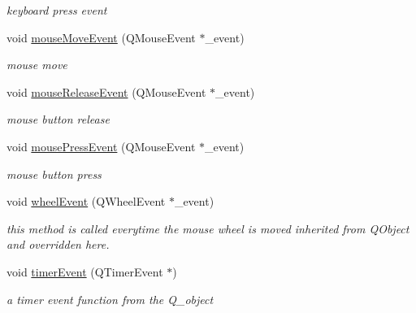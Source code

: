\begin{DoxyCompactItemize}
\begin{DoxyCompactList}\small\item\em keyboard press event \end{DoxyCompactList}\item 
\hypertarget{class_open_g_l_widget_aa6d543f552c813df3b3a78dc5c4899fd}{void \hyperlink{class_open_g_l_widget_aa6d543f552c813df3b3a78dc5c4899fd}{mouse\-Move\-Event} (Q\-Mouse\-Event $\ast$\-\_\-event)}\label{class_open_g_l_widget_aa6d543f552c813df3b3a78dc5c4899fd}

\begin{DoxyCompactList}\small\item\em mouse move \end{DoxyCompactList}\item 
\hypertarget{class_open_g_l_widget_aa3f5541e5da2d5c52ca16b99f40dfd75}{void \hyperlink{class_open_g_l_widget_aa3f5541e5da2d5c52ca16b99f40dfd75}{mouse\-Release\-Event} (Q\-Mouse\-Event $\ast$\-\_\-event)}\label{class_open_g_l_widget_aa3f5541e5da2d5c52ca16b99f40dfd75}

\begin{DoxyCompactList}\small\item\em mouse button release \end{DoxyCompactList}\item 
\hypertarget{class_open_g_l_widget_adaab83f0bed689b0765d42b6ae760220}{void \hyperlink{class_open_g_l_widget_adaab83f0bed689b0765d42b6ae760220}{mouse\-Press\-Event} (Q\-Mouse\-Event $\ast$\-\_\-event)}\label{class_open_g_l_widget_adaab83f0bed689b0765d42b6ae760220}

\begin{DoxyCompactList}\small\item\em mouse button press \end{DoxyCompactList}\item 
void \hyperlink{class_open_g_l_widget_a0682546d360b7ce9ae1dce31a090cfca}{wheel\-Event} (Q\-Wheel\-Event $\ast$\-\_\-event)
\begin{DoxyCompactList}\small\item\em this method is called everytime the mouse wheel is moved inherited from Q\-Object and overridden here. \end{DoxyCompactList}\item 
\hypertarget{class_open_g_l_widget_a11473cec64e843211458fd83f9d6ad72}{void \hyperlink{class_open_g_l_widget_a11473cec64e843211458fd83f9d6ad72}{timer\-Event} (Q\-Timer\-Event $\ast$)}\label{class_open_g_l_widget_a11473cec64e843211458fd83f9d6ad72}

\begin{DoxyCompactList}\small\item\em a timer event function from the Q\-\_\-object \end{DoxyCompactList}\end{DoxyCompactItemize}
